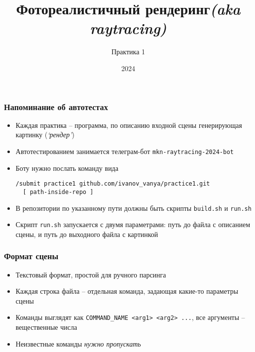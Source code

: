 \documentclass[10pt]{beamer}
\title{Фотореалистичный рендеринг\quad\quad\quad\quad\quad\quad \textit{(aka raytracing)}}
\subtitle{Практика 1}
\date{2024}
\begin{document}
\frame{\titlepage}

\begin{frame}[fragile]
\frametitle{Напоминание об автотестах}
\begin{itemize}
\item Каждая практика -- программа, по описанию входной сцены генерирующая картинку (\textit{`рендер'})
\pause
\item Автотестированием занимается телеграм-бот \texttt{mkn-raytracing-2024-bot}
\pause
\item Боту нужно послать команду вида
\begin{verbatim}
/submit practice1 github.com/ivanov_vanya/practice1.git
  [ path-inside-repo ]
\end{verbatim}
\pause
\item В репозитории по указанному пути должны быть скрипты \texttt{build.sh} и \texttt{run.sh}
\pause
\item Скрипт \texttt{run.sh} запускается с двумя параметрами: путь до файла с описанием сцены, и путь до выходного файла с картинкой
\end{itemize}
\end{frame}

\begin{frame}
\frametitle{Формат сцены}
\begin{itemize}
\item Текстовый формат, простой для ручного парсинга
\pause
\item Каждая строка файла -- отдельная команда, задающая какие-то параметры сцены
\pause
\item Команды выглядят как \texttt{COMMAND\_NAME <arg1> <arg2> ...}, все аргументы -- вещественные числа
\pause
\item Неизвестные команды \textit{нужно пропускать}
\end{itemize}
\end{frame}
\end{document}

